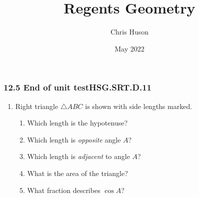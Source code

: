 \documentclass[12pt, twoside]{article}
\title{Regents Geometry}
\author{Chris Huson}
\date{May 2022}
\begin{document}
\subsubsection*{12.5 End of unit test\hfill HSG.SRT.D.11}

\begin{enumerate}
  \item Right triangle $\triangle ABC$ is shown with side lengths marked.
  \begin{multicols}{2}
    \begin{enumerate}
      \item Which length is the hypotenuse? \vspace{0.5cm}
      \item Which length is \emph{opposite} angle $A$?  \vspace{0.5cm}
      \item Which length is \emph{adjacent} to angle $A$? %
      \item What is the area of the triangle? \vspace{1cm}
      \item What fraction describes $\cos A$? \vspace{1cm}
    \end{enumerate}
  \begin{flushright}
  \end{flushright}
  \end{multicols}
  

\end{enumerate}
\end{document}
